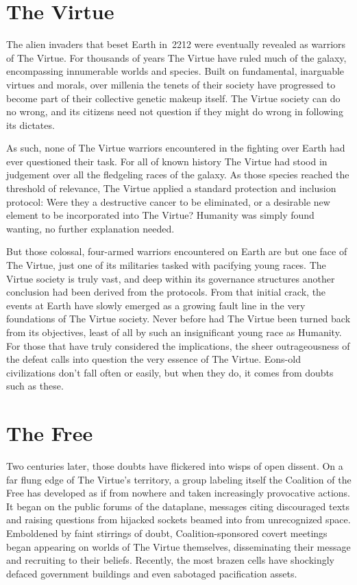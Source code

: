 \documentclass{novanarrative}
\begin{document}
\section{The Virtue}

The alien invaders that beset Earth in~2212 were eventually revealed
as warriors of The Virtue.  For thousands of years The Virtue have
ruled much of the galaxy, encompassing innumerable worlds and species.
Built on fundamental, inarguable virtues and morals, over millenia the
tenets of their society have progressed to become part of their
collective genetic makeup itself.  The Virtue society can do no wrong,
and its citizens need not question if they might do wrong in following
its dictates.

As such, none of The Virtue warriors encountered in the fighting over
Earth had ever questioned their task.  For all of known history The
Virtue had stood in judgement over all the fledgeling races of the
galaxy.  As those species reached the threshold of relevance, The
Virtue applied a standard protection and inclusion protocol: Were they
a destructive cancer to be eliminated, or a desirable new element to
be incorporated into The Virtue?  Humanity was simply found wanting,
no further explanation needed.

But those colossal, four-armed warriors encountered on Earth are but
one face of The Virtue, just one of its militaries tasked with
pacifying young races.  The Virtue society is truly vast, and deep
within its governance structures another conclusion had been derived
from the protocols.  From that initial crack, the events at Earth have
slowly emerged as a growing fault line in the very foundations of The
Virtue society.  Never before had The Virtue been turned back from its
objectives, least of all by such an insignificant young race as
Humanity.  For those that have truly considered the implications, the
sheer outrageousness of the defeat calls into question the very
essence of The Virtue.  Eons-old civilizations don't fall often or
easily, but when they do, it comes from doubts such as these.

\section{The Free}

Two centuries later, those doubts have flickered into wisps of open
dissent.  On a far flung edge of The Virtue's territory, a group
labeling itself the Coalition of the Free has developed as if from
nowhere and taken increasingly provocative actions.  It began on the
public forums of the dataplane, messages citing discouraged texts and
raising questions from hijacked sockets beamed into from unrecognized
space.  Emboldened by faint stirrings of doubt, Coalition-sponsored
covert meetings began appearing on worlds of The Virtue themselves,
disseminating their message and recruiting to their beliefs.
Recently, the most brazen cells have shockingly defaced government
buildings and even sabotaged pacification assets.
\end{document}
